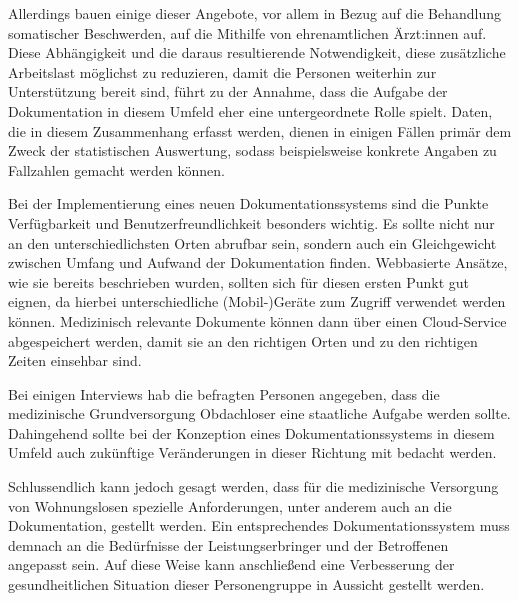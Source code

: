 Allerdings bauen einige dieser Angebote, vor allem in Bezug auf die Behandlung somatischer Beschwerden, auf die Mithilfe von ehrenamtlichen Ärzt:innen auf. Diese Abhängigkeit und die daraus resultierende Notwendigkeit, diese zusätzliche Arbeitslast möglichst zu reduzieren, damit die Personen weiterhin zur Unterstützung bereit sind, führt zu der Annahme, dass die Aufgabe der Dokumentation in diesem Umfeld eher eine untergeordnete Rolle spielt. Daten, die in diesem Zusammenhang erfasst werden, dienen in einigen Fällen primär dem Zweck der statistischen Auswertung, sodass beispielsweise konkrete Angaben zu Fallzahlen gemacht werden können.

Bei der Implementierung eines neuen Dokumentationssystems sind die Punkte Verfügbarkeit und Benutzerfreundlichkeit besonders wichtig. Es sollte nicht nur an den unterschiedlichsten Orten abrufbar sein, sondern auch ein Gleichgewicht zwischen Umfang und Aufwand der Dokumentation finden. Webbasierte Ansätze, wie sie bereits beschrieben wurden, sollten sich für diesen ersten Punkt gut eignen, da hierbei unterschiedliche (Mobil-)Geräte zum Zugriff verwendet werden können. Medizinisch relevante Dokumente können dann über einen Cloud-Service abgespeichert werden, damit sie an den richtigen Orten und zu den richtigen Zeiten einsehbar sind.

Bei einigen Interviews hab die befragten Personen angegeben, dass die medizinische Grundversorgung Obdachloser eine staatliche Aufgabe werden sollte. Dahingehend sollte bei der Konzeption eines Dokumentationssystems in diesem Umfeld auch zukünftige Veränderungen in dieser Richtung mit bedacht werden.

Schlussendlich kann jedoch gesagt werden, dass für die medizinische Versorgung von Wohnungslosen spezielle Anforderungen, unter anderem auch an die Dokumentation, gestellt werden. Ein entsprechendes Dokumentationssystem muss demnach an die Bedürfnisse der Leistungserbringer und der Betroffenen angepasst sein. Auf diese Weise kann anschließend eine Verbesserung der gesundheitlichen Situation dieser Personengruppe in Aussicht gestellt werden.